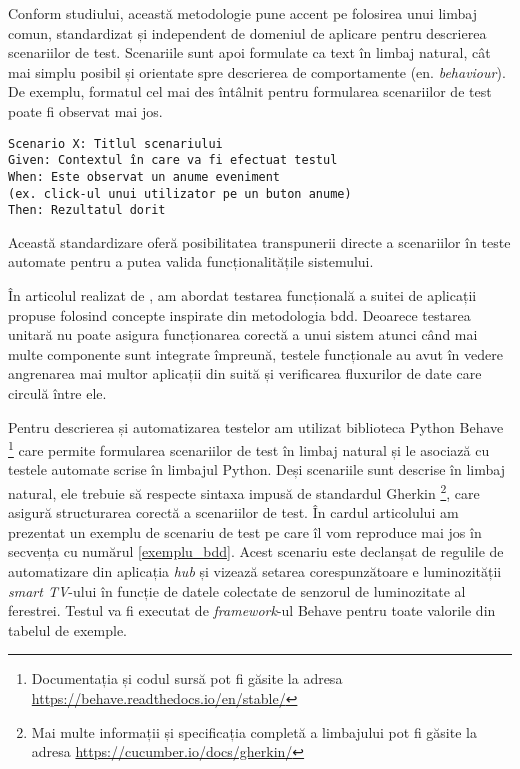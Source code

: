 Conform studiului, această metodologie pune accent pe folosirea unui limbaj comun, standardizat și independent de domeniul de aplicare pentru descrierea scenariilor de test. Scenariile sunt apoi formulate ca text în limbaj natural, cât mai simplu posibil și orientate spre descrierea de comportamente (en. \textit{behaviour}). De exemplu, formatul cel mai des întâlnit pentru formularea scenariilor de test poate fi observat mai jos.

\begin{lstlisting}[caption={Structură comună a unui scenariu de test folosind BDD}]
Scenario X: Titlul scenariului
Given: Contextul în care va fi efectuat testul
When: Este observat un anume eveniment 
(ex. click-ul unui utilizator pe un buton anume)
Then: Rezultatul dorit
\end{lstlisting}

Această standardizare oferă posibilitatea transpunerii directe a scenariilor în teste automate pentru a putea valida funcționalitățile sistemului.

În articolul realizat de \cite{Cristea2022}, am abordat testarea funcțională a suitei de aplicații propuse folosind concepte inspirate din metodologia \acrshort{bdd}. Deoarece testarea unitară nu poate asigura funcționarea corectă a unui sistem atunci când mai multe componente sunt integrate împreună, testele funcționale au avut în vedere angrenarea mai multor aplicații din suită și verificarea fluxurilor de date care circulă între ele.

Pentru descrierea și automatizarea testelor am utilizat biblioteca Python Behave \footnote{Documentația și codul sursă pot fi găsite la adresa \url{https://behave.readthedocs.io/en/stable/}} care permite formularea scenariilor de test în limbaj natural și le asociază cu testele automate scrise în limbajul Python. Deși scenariile sunt descrise în limbaj natural, ele trebuie să respecte sintaxa impusă de standardul Gherkin \footnote{Mai multe informații și specificația completă a limbajului pot fi găsite la adresa \url{https://cucumber.io/docs/gherkin/}}, care asigură structurarea corectă a scenariilor de test. În cardul articolului am prezentat un exemplu de scenariu de test pe care îl vom reproduce mai jos în secvența cu numărul \ref{exemplu_bdd}. Acest scenariu este declanșat de regulile de automatizare din aplicația \textit{hub} și vizează setarea corespunzătoare e luminozității \textit{smart TV}-ului în funcție de datele colectate de senzorul de luminozitate al ferestrei. Testul va fi executat de \textit{framework}-ul Behave pentru toate valorile din tabelul de exemple.


